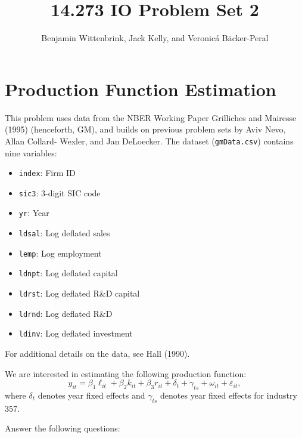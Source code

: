 \documentclass{article}
\title{14.273 IO Problem Set 2}
\author{Benjamin Wittenbrink, Jack Kelly, and Veronicá Bäcker-Peral}
\begin{document}
\maketitle

\section{Production Function Estimation}

This problem uses data from the NBER Working Paper Grilliches and Mairesse (1995) (henceforth, GM), and builds on previous problem sets by Aviv Nevo, Allan Collard-
Wexler, and Jan DeLoecker. The dataset (\texttt{gmData.csv}) contains nine variables: 
\begin{itemize}
\item \texttt{index}: Firm ID
\item \texttt{sic3}: 3-digit SIC code
\item \texttt{yr}: Year
\item \texttt{ldsal}: Log deflated sales
\item \texttt{lemp}: Log employment
\item \texttt{ldnpt}: Log deflated capital 
\item \texttt{ldrst}: Log deflated R\&D capital
\item \texttt{ldrnd}: Log deflated R\&D
\item \texttt{ldinv}: Log deflated investment
\end{itemize}
For additional details on the data, see Hall (1990). 

We are interested in estimating the following production function:
\begin{equation}\label{p1_prod_fn}
y_{it} = \beta_1 \ell_{it} + \beta_2 k_{it} + \beta_3 r_{it} + \delta_t + \gamma_{ts} + \omega_{it} + \varepsilon_{it},
\end{equation}
where $\delta_t$ denotes year fixed effects and $ \gamma_{ts}$ denotes year fixed effects for industry 357. 

Answer the following questions:
\end{document}
